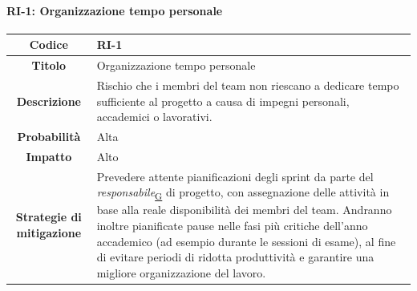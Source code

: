 \documentclass[a4paper,12pt]{article}
\begin{document}
{{        \paragraph{RI-1: Organizzazione tempo personale}\mbox{}{ 
                \begin{longtable}{|c|p{11cm}|}
                    \hline
                    \textbf{Codice} & RI-1 \\
                    \hline
                    \textbf{Titolo} & Organizzazione tempo personale \\
                    \hline
                    \textbf{Descrizione} & Rischio che i membri del team non riescano a dedicare tempo sufficiente al progetto a causa di impegni personali, accademici o lavorativi. \\
                    \hline
                    \textbf{Probabilità} & Alta \\
                    \hline
                    \textbf{Impatto} & Alto \\
                    \hline
                    \textbf{Strategie di mitigazione} & Prevedere attente pianificazioni degli sprint da parte del \textit{responsabile}\textsubscript{\href{https://atlasteam9.github.io/Atlas/glossario.html\#Responsabile}{G}} di progetto, con assegnazione delle attività in base 
                        alla reale disponibilità dei membri del team. Andranno inoltre pianificate pause nelle fasi più critiche dell'anno accademico (ad esempio durante le sessioni di esame), 
                        al fine di evitare periodi di ridotta produttività e garantire una migliore organizzazione del lavoro. \\
                    \hline
                \end{longtable}
            }     
    }
}

\newpage
\end{document}
